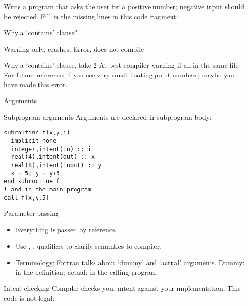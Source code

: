 \begin{exercise}
  \label{ex:freadpos}
  Write a program that asks the user for a positive number; negative
  input should be rejected.  Fill in the missing lines in this code
  fragment:
\end{exercise}

\begin{block}{Why a `contains' clause?}
  \label{sl:whycontain}
  \begin{multicols}{2}
    Warning only, crashes.
    \vfill\columnbreak
    Error, does not compile
  \end{multicols}
\end{block}

\begin{block}{Why a `contains' clause, take 2}
  \label{sl:whycontain_type}
  At best compiler warning if all in the same file\\
  For future reference: if you see very small floating point numbers,
  maybe you have made this error.
\end{block}

 {Arguments}

\begin{block}{Subprogram arguments}
  \label{sl:farguments}
 Arguments are declared in subprogram body:
\begin{verbatim}
subroutine f(x,y,i)
  implicit none
  integer,intent(in) :: i
  real(4),intent(out) :: x
  real(8),intent(inout) :: y
  x = 5; y = y+6
end subroutine f
! and in the main program
call f(x,y,5)
\end{verbatim}
\end{block}

\begin{block}{Parameter passing}
  \label{sl:fpassing}
  \begin{itemize}
  \item Everything is passed by reference.
  \item Use , ,  qualifiers to clarify semantics
    to compiler.
  \item Terminology: Fortran talks about `dummy' and `actual'
    arguments. Dummy: in the definition; actual: in the calling program.
  \end{itemize}
\end{block}

\begin{block}{Intent checking}
  \label{sl:fintent}
  Compiler checks your intent against your implementation. This code
  is not legal:

\end{block}

